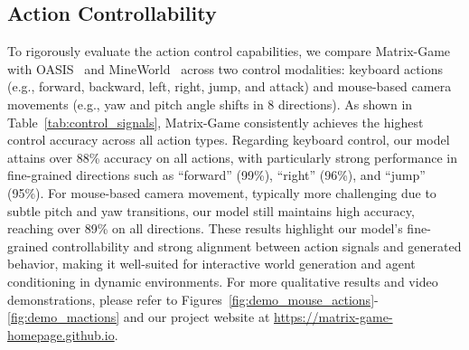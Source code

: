 \documentclass{article}
\begin{document}
\subsection{Action Controllability} 
To rigorously evaluate the action control capabilities, we compare {Matrix-Game} with OASIS~\cite{oasis2024} and MineWorld~\cite{guo2025mineworld} across two control modalities: keyboard actions (e.g., forward, backward, left, right, jump, and attack) and mouse-based camera movements (e.g., yaw and pitch angle shifts in 8 directions). As shown in Table~\ref{tab:control_signals}, {Matrix-Game} consistently achieves the highest control accuracy across all action types. Regarding keyboard control, our model attains over {88\%} accuracy on all actions, with particularly strong performance in fine-grained directions such as “forward” (99\%), “right” (96\%), and “jump” (95\%). For mouse-based camera movement, typically more challenging due to subtle pitch and yaw transitions, our model still maintains high accuracy, reaching {over 89\%} on all directions. These results highlight our model’s fine-grained controllability and strong alignment between action signals and generated behavior, making it well-suited for interactive world generation and agent conditioning in dynamic environments. For more qualitative results and video demonstrations, please refer to Figures~\ref{fig:demo_mouse_actions}-\ref{fig:demo_mactions} and our project website at \url{https://matrix-game-homepage.github.io}.
 
\end{document}
